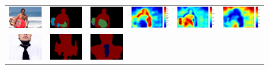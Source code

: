 \documentclass[10pt,twocolumn,letterpaper]{article}
\begin{document}
\begin{figure}[!h]
{\begin{tabular}{c c c c c c}
   \includegraphics[height=0.095\linewidth]{fig/coco/img/COCO_val2014_000000018444.jpg} &
   \includegraphics[height=0.095\linewidth]{fig/coco/res_baseline/COCO_val2014_000000018444.png} &
   \includegraphics[height=0.095\linewidth]{fig/coco/res_sharenet/COCO_val2014_000000018444.png} &
   \includegraphics[height=0.095\linewidth]{fig/coco/att1/COCO_val2014_000000018444.pdf} &
   \includegraphics[height=0.095\linewidth]{fig/coco/att2/COCO_val2014_000000018444.pdf} &
   \includegraphics[height=0.095\linewidth]{fig/coco/att3/COCO_val2014_000000018444.pdf} \\
   \includegraphics[height=0.115\linewidth]{fig/coco/img/COCO_val2014_000000006847.jpg} &
   \includegraphics[height=0.115\linewidth]{fig/coco/res_baseline/COCO_val2014_000000006847.png} &
   \includegraphics[height=0.115\linewidth]{fig/coco/res_sharenet/COCO_val2014_000000006847.png} &

\end{tabular}}
\end{figure}
\end{document}
